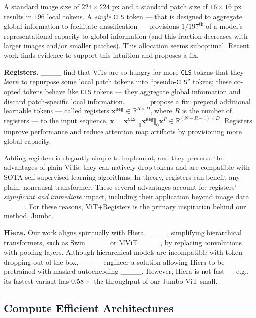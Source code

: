 A standard image size of $224\times224$ px and a standard patch size of $16\times16$ px results in $196$ local tokens. A \emph{single} \texttt{CLS} token --- that is designed to aggregate global information to facilitate classification --- provisions $1/197^{\text{th}}$ of a model's representational capacity to global information (and this fraction decreases with larger images and/or smaller patches). This allocation seems suboptimal. Recent work finds evidence to support this intuition and proposes a fix.

\textbf{Registers.} ____ find that ViTs are so hungry for more \texttt{CLS} tokens that they \emph{learn} to repurpose some local patch tokens into ``pseudo-\texttt{CLS}'' tokens; these co-opted tokens behave like \texttt{CLS} tokens --- they aggregate global information and discard patch-specific local information. ____ propose a fix: prepend additional learnable tokens --- called registers $\mathbf{x}^{\texttt{Reg}}\in\mathbb{R}^{R \times D}$, where $R$ is the number of registers --- to the input sequence, $\mathbf{x} = \mathbf{x}^{\texttt{CLS}} \Vert_{0} \mathbf{x}^{\texttt{Reg}} \Vert_{0} \mathbf{x}^{P} \in \mathbb{R}^{(N+R+1) \times D}$. Registers improve performance and reduce attention map artifacts by provisioning more global capacity. 

Adding registers is elegantly simple to implement, and they preserve the advantages of plain ViTs; they can natively drop tokens and are compatible with SOTA self-supervised learning algorithms. In theory, registers can benefit any plain, noncausal transformer. These several advantages account for registers' \emph{significant and immediate} impact, including their application beyond image data ____. For these reasons, ViT+Registers is the primary inspiration behind our method, Jumbo.

\textbf{Hiera.} Our work aligns spiritually with Hiera ____, simplifying hierarchical transformers, such as Swin ____ or MViT ____, by replacing convolutions with pooling layers. Although hierarchical models are incompatible with token dropping out-of-the-box, ____ engineer a solution allowing Hiera to be pretrained with masked autoencoding ____. However, Hiera is not fast --- e.g., its fastest variant has $0.58 \times$ the throughput of our Jumbo ViT-small.

\subsection{Compute Efficient Architectures}\label{sec:compute-efficient}


